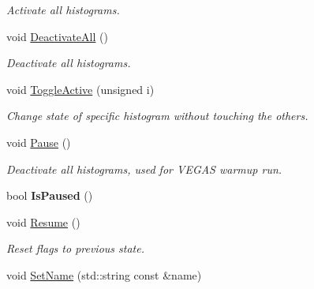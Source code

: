 \begin{DoxyCompactItemize}
\begin{DoxyCompactList}\small\item\em Activate all histograms. \end{DoxyCompactList}\item 
\hypertarget{classHistArray_a74a91eee643bcadc657103521549d275}{}void \hyperlink{classHistArray_a74a91eee643bcadc657103521549d275}{Deactivate\+All} ()\label{classHistArray_a74a91eee643bcadc657103521549d275}

\begin{DoxyCompactList}\small\item\em Deactivate all histograms. \end{DoxyCompactList}\item 
\hypertarget{classHistArray_ab6d76cb0d5bf1915dbc48f53ce498bb2}{}void \hyperlink{classHistArray_ab6d76cb0d5bf1915dbc48f53ce498bb2}{Toggle\+Active} (unsigned i)\label{classHistArray_ab6d76cb0d5bf1915dbc48f53ce498bb2}

\begin{DoxyCompactList}\small\item\em Change state of specific histogram without touching the others. \end{DoxyCompactList}\item 
\hypertarget{classHistArray_a27f9acb7029ec4c90b4476e5bc26037d}{}void \hyperlink{classHistArray_a27f9acb7029ec4c90b4476e5bc26037d}{Pause} ()\label{classHistArray_a27f9acb7029ec4c90b4476e5bc26037d}

\begin{DoxyCompactList}\small\item\em Deactivate all histograms, used for V\+E\+G\+A\+S warmup run. \end{DoxyCompactList}\item 
\hypertarget{classHistArray_a29c4b8cbb3613f5220e32be5559c55d7}{}bool {\bfseries Is\+Paused} ()\label{classHistArray_a29c4b8cbb3613f5220e32be5559c55d7}

\item 
\hypertarget{classHistArray_ab6afeb98498add41c6f810eb68ed28ba}{}void \hyperlink{classHistArray_ab6afeb98498add41c6f810eb68ed28ba}{Resume} ()\label{classHistArray_ab6afeb98498add41c6f810eb68ed28ba}

\begin{DoxyCompactList}\small\item\em Reset flags to previous state. \end{DoxyCompactList}\item 
\hypertarget{classHistArray_af40b91f1863ab8e68bdf2ac11e8f9767}{}void \hyperlink{classHistArray_af40b91f1863ab8e68bdf2ac11e8f9767}{Set\+Name} (std\+::string const \&name)\label{classHistArray_af40b91f1863ab8e68bdf2ac11e8f9767}


\end{DoxyCompactItemize}
